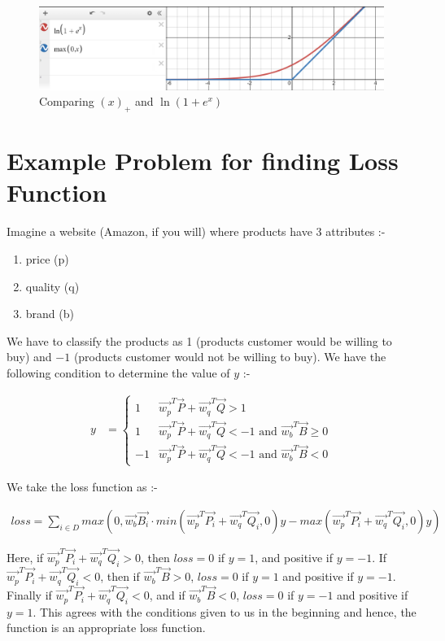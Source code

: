 \documentclass[12pt]{article}
\begin{document}
\begin{figure}[h]
    \centering
    \includegraphics[width=400pt]{graph.png}
    \caption{Comparing $(x)_+$ and $\ln (1+e^x)$}
\end{figure}

\section{Example Problem for finding Loss Function}

Imagine a website (Amazon, if you will) where products have 3 attributes :-

\begin{enumerate}
    \item price (p)
    \item quality (q)
    \item brand (b)
\end{enumerate}

We have to classify the products as 1 (products customer would be willing to buy) and $-1$ (products customer would not be willing to buy). We have the following condition to determine the value of $y$ :-

\begin{align*}
y &=\begin{cases} 
      1 & \vec{w_p}^{T}\vec{P}+\vec{w_q}^{T}\vec{Q}> 1 \\
      1 & \vec{w_p}^{T}\vec{P}+\vec{w_q}^{T}\vec{Q} < -1 \text{ and } \vec{w_b}^{T}\vec{B} \geq 0  \\
      -1 & \vec{w_p}^{T}\vec{P}+\vec{w_q}^{T}\vec{Q} <-1 \text{ and } \vec{w_b}^{T}\vec{B} < 0
   \end{cases}
\end{align*}

We take the loss function as :-

\begin{align*}
    loss = \sum_{i \in D}{max(0,\vec{w_b}\vec{B_i}\cdot min(\vec{w_p}^{T}\vec{P_i}+\vec{w_q}^{T}\vec{Q_i},0)y- max(\vec{w_p}^{T}\vec{P_i}+\vec{w_q}^{T}\vec{Q_i},0)y)}
\end{align*}

Here, if $\vec{w_p}^{T}\vec{P_i}+\vec{w_q}^{T}\vec{Q_i} > 0$, then $loss = 0$ if $y = 1$, and positive if $y=-1$. If $\vec{w_p}^{T}\vec{P_i}+\vec{w_q}^{T}\vec{Q_i} < 0$, then if $\vec{w_b}^{T}\vec{B} > 0$, $loss=0$ if $y=1$ and positive if $y=-1$. Finally if $\vec{w_p}^{T}\vec{P_i}+\vec{w_q}^{T}\vec{Q_i} < 0$, and if $\vec{w_b}^{T}\vec{B} < 0$, $loss=0$ if $y=-1$ and positive if $y=1$. This agrees with the conditions given to us in the beginning and hence, the function is an appropriate loss function.\\
\end{document}
